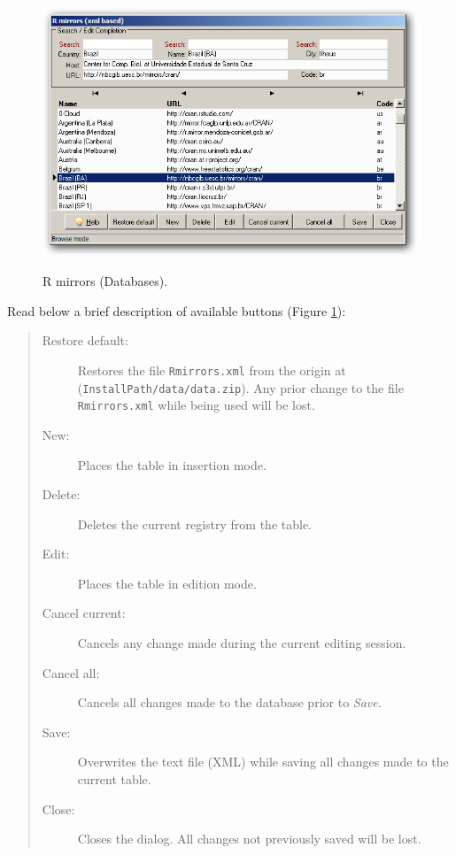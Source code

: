 \begin{figure}[h!]
  \includegraphics[scale=0.35]{./res/mirrors_dlg.png}\\
  \caption{R mirrors (Databases).}
  \label{fig:mirrors_dlg}
\end{figure}

Read below a brief description of available buttons (Figure \ref{fig:mirrors_dlg}):

\begin{quote}
  \begin{footnotesize}
    \begin{description}
      \item[Restore default:]
        Restores the file \texttt{Rmirrors.xml} from the origin at
        (\texttt{InstallPath/data/data.zip}). Any prior change to the
        file \texttt{Rmirrors.xml} while being used will be lost.
      \item[New:]
        Places the table in insertion mode.
      \item[Delete:]
        Deletes the current registry from the table.
      \item[Edit:]
        Places the table in edition mode.
      \item[Cancel current:]
        Cancels any change made during the current editing session.
      \item[Cancel all:]
        Cancels all changes made to the database prior to \textit{Save}.
      \item[Save:]
        Overwrites the text file (XML) while saving all changes made to the current table.
      \item[Close:]
        Closes the dialog. All changes not previously saved will be lost.
    \end{description}
  \end{footnotesize}
\end{quote}
